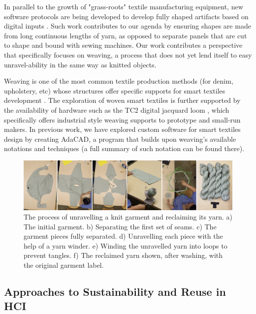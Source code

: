 In parallel to the growth of "grass-roots" textile manufacturing equipment, new software protocols are being developed to develop fully shaped artifacts based on digital inputs \cite{mccann_compiler_2016, albaugh_digital_2019}. Such work contributes to our agenda by ensuring shapes are made from long continuous lengths of yarn, as opposed to separate panels that are cut to shape and bound with sewing machines. Our work contributes a perspective that specifically focuses on weaving, a process that does not yet lend itself to easy unravel-ability in the same way as knitted objects. 

Weaving is one of the most common textile production methods (for denim, upholstery, etc) whose structures offer specific supports for smart textiles development \cite{devendorf_adapting_2019, poupyrev_project_2016, worbin_designing_2010, orth_fabric_1998, mikkonen_weaving_2015}. The exploration of woven smart textiles is further supported by the availability of hardware such as the TC2 digital jacquard loom \cite{norway_tc2_nodate}, which specifically offers industrial style weaving supports to prototype and small-run makers. In previous work, we have explored custom software for smart textiles design by creating AdaCAD, a program that builds upon weaving's available notations and techniques \cite{friske_adacad:_2019} (a full summary of such notation can be found there).

\begin{figure}
    \centering
    \includegraphics[width=\linewidth]{figs/UF_unravelling_6panels.png}
    \caption[The process of unravelling a knit garment and reclaiming its yarn.]{The process of unravelling a knit garment and reclaiming its yarn. a) The initial garment. b) Separating the first set of seams. c) The garment pieces fully separated. d) Unravelling each piece with the help of a yarn winder. e) Winding the unravelled yarn into loops to prevent tangles. f) The reclaimed yarn shown, after washing, with the original garment label.}
    \label{fig:unravelProcess}
\end{figure}

\subsection{Approaches to Sustainability and Reuse in HCI}

